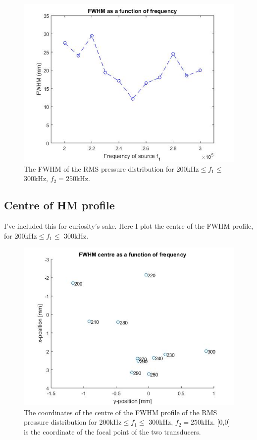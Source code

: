 \documentclass[10pt,a4paper]{article}
\begin{document}
\begin{figure}[H]\label{FWHM_freq}
\centering
\includegraphics[scale=0.6]{FWHM_freq}
\caption{The FWHM of the RMS pressure distribution for 200kHz$\leq f_1 \leq$ 300kHz, $f_2 = 250$kHz.}
\end{figure}


\subsection*{Centre of HM profile}

I've included this for curiosity's sake. Here I plot the centre of the FWHM profile, for 200kHz$\leq f_1 \leq$ 300kHz.
\begin{figure}[H]\label{FWHM_centre}
\centering
\includegraphics[scale=0.6]{FWHM_centre}
\caption{The coordinates of the centre of the FWHM profile of the RMS pressure distribution for 200kHz$\leq f_1 \leq$ 300kHz, $f_2 = 250$kHz. [0,0] is the coordinate of the focal point of the two transducers.}
\end{figure}
\end{document}
